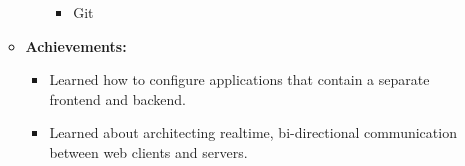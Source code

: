 \documentclass[12pt, oneside, a4paper]{article}
\begin{document}
\begin{itemize}
\begin{itemize}
\begin{itemize}
\begin{itemize}
                        \item Git
                    \end{itemize}
              \end{itemize}
              \item \textbf{Achievements:}
              \begin{itemize}
                \item Learned how to configure applications that contain a separate frontend and backend.
                \item Learned about architecting realtime, bi-directional communication between web clients and servers.
              \end{itemize}
          \end{itemize}
\end{itemize}
\end{document}
